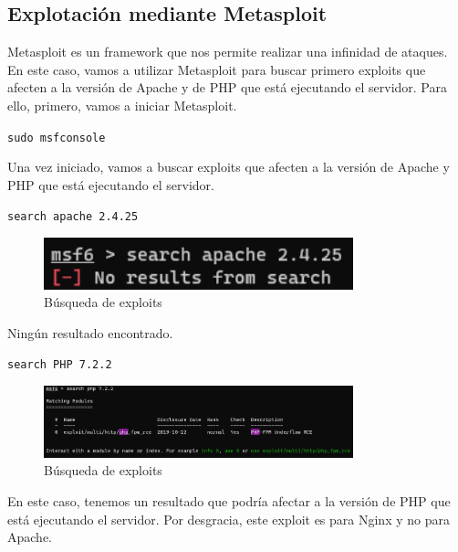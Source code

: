 \documentclass{report}
\begin{document}
            \subsection{Explotación mediante Metasploit}
                Metasploit es un framework que nos permite realizar una infinidad de ataques.
                En este caso, vamos a utilizar Metasploit para buscar primero exploits que afecten a la versión de Apache y de PHP que está ejecutando el servidor.
                Para ello, primero, vamos a iniciar Metasploit.
                \begin{center}
                    \texttt{sudo msfconsole}
                \end{center}
                Una vez iniciado, vamos a buscar exploits que afecten a la versión de Apache y PHP que está ejecutando el servidor.
                \begin{center}
                    \texttt{search apache 2.4.25}
                \end{center}
                \begin{figure}[H]
                    \centering
                    \includegraphics[width=0.8\textwidth]{./img/vulnerabilidades/2.5/1.1.png}
                    \caption{Búsqueda de exploits}
                \end{figure}
                Ningún resultado encontrado.\\
                \begin{center}
                    \texttt{search PHP 7.2.2}
                \end{center}
                \begin{figure}[H]
                    \centering
                    \includegraphics[width=0.8\textwidth]{./img/vulnerabilidades/2.5/1.2.png}
                    \caption{Búsqueda de exploits}
                \end{figure}
                En este caso, tenemos un resultado que podría afectar a la versión de PHP que está ejecutando el servidor. Por desgracia, este exploit es para Nginx y no para Apache.\\
\end{document}
